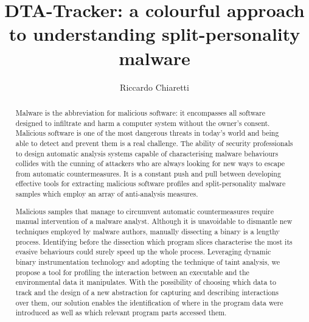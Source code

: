 \documentclass[LaM,binding=0.6cm]{sapthesis}
\title{DTA-Tracker: a colourful approach to understanding split-personality malware}
\author{Riccardo Chiaretti}
\begin{document}
\frontmatter
\maketitle

\dedication{Dedicated to to my parents and my brother, \\without their support I would never have achieved this goal.}

\begin{abstract}
Malware is the abbreviation for malicious software: it encompasses all software designed to infiltrate and harm a computer system without the owner's consent. Malicious software is one of the most dangerous threats in today's world and being able to detect and prevent them is a real challenge. The ability of security professionals to design automatic analysis systems capable of characterising malware behaviours collides with the cunning of attackers who are always looking for new ways to escape from automatic countermeasures. It is a constant push and pull between developing effective tools for extracting malicious software profiles and split-personality malware samples which employ an array of anti-analysis measures.

Malicious samples that manage to circumvent automatic countermeasures require manual intervention of a malware analyst. Although it is unavoidable to dismantle new techniques employed by malware authors, manually dissecting a binary is a lengthy process. Identifying before the dissection which program slices characterise the most its evasive behaviours could surely speed up the whole process. Leveraging dynamic binary instrumentation technology and adopting the technique of taint analysis, we propose a tool for profiling the interaction between an executable and the environmental data it manipulates. With the possibility of choosing which data to track and the design of a new abstraction for capturing and describing interactions over them, our solution enables the identification of where in the program data were introduced as well as which relevant program parts accessed them. 
\end{abstract}
\end{document}
